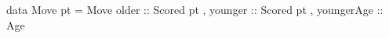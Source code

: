 data Move pt = Move { older      :: Scored pt
                    , younger    :: Scored pt
                    , youngerAge :: Age }
